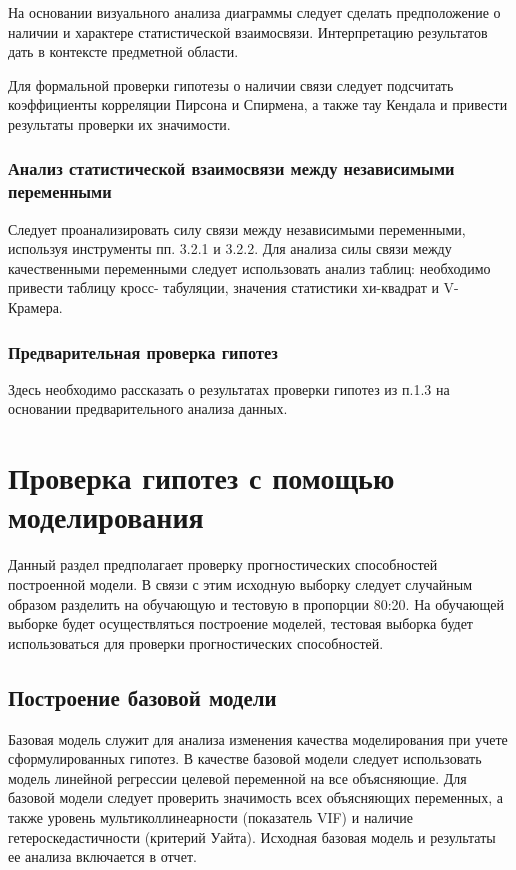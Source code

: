 \documentclass[12pt]{article}
\begin{document}
На основании визуального анализа диаграммы следует сделать предположение о
наличии и характере статистической взаимосвязи. Интерпретацию результатов дать в
контексте предметной области.

Для формальной проверки гипотезы о наличии связи следует подсчитать
коэффициенты корреляции Пирсона и Спирмена, а также тау Кендала и привести
результаты проверки их значимости.

\subsubsection{Анализ статистической взаимосвязи между независимыми переменными}

Следует проанализировать силу связи между независимыми переменными,
используя инструменты пп. 3.2.1 и 3.2.2. Для анализа силы связи между качественными
переменными следует использовать анализ таблиц: необходимо привести таблицу кросс-
табуляции, значения статистики хи-квадрат и V-Крамера.

\subsubsection{Предварительная проверка гипотез}
Здесь необходимо рассказать о результатах проверки гипотез из п.1.3 на основании
предварительного анализа данных.

\section{Проверка гипотез с помощью моделирования}
Данный раздел предполагает проверку прогностических способностей построенной
модели. В связи с этим исходную выборку следует случайным образом разделить на
обучающую и тестовую в пропорции 80:20. На обучающей выборке будет осуществляться
построение моделей, тестовая выборка будет использоваться для проверки
прогностических способностей.

\subsection{Построение базовой модели}
Базовая модель служит для анализа изменения качества моделирования при учете
сформулированных гипотез. В качестве базовой модели следует использовать модель
линейной регрессии целевой переменной на все объясняющие. Для базовой модели
следует проверить значимость всех объясняющих переменных, а также уровень
мультиколлинеарности (показатель VIF) и наличие гетероскедастичности (критерий Уайта).
Исходная базовая модель и результаты ее анализа включается в отчет.
\end{document}
